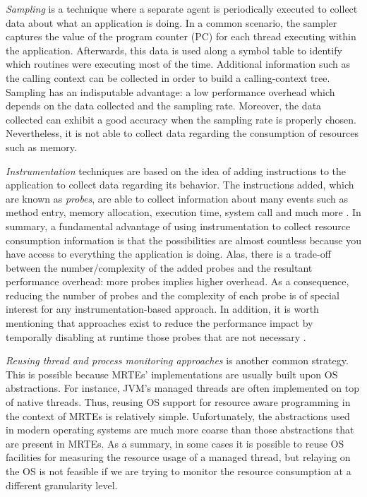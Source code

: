 \textit{Sampling} is a technique where a separate agent is periodically executed to collect data about what an application is doing.
In a common scenario, the sampler captures the value of the program counter (PC) for each thread executing within the application.
Afterwards, this data is used along a symbol table to identify which routines were executing most of the time.
Additional information such as the calling context can be collected in order to build a calling-context tree.
Sampling has an indisputable advantage: a low performance overhead which depends on the data collected and the sampling rate.
Moreover, the data collected can exhibit a good accuracy when the sampling rate is properly chosen.  
Nevertheless, it is not able to collect data regarding the consumption of resources such as memory.

\textit{Instrumentation} techniques are based on the idea of adding instructions to the application to collect data regarding its behavior.
The instructions added, which are known as \textit{probes}, are able to collect information about many events such as method entry, memory allocation, execution time, system call and much more \cite{}.
In summary, a fundamental advantage of using instrumentation to collect resource consumption information is that the possibilities are almost countless because you have access to everything the application is doing.
Alas, there is a trade-off between the number/complexity of the added probes and the resultant performance overhead: more probes implies higher overhead.
As a consequence, reducing the number of probes and the complexity of each probe is of special interest for any instrumentation-based approach.
In addition, it is worth mentioning that approaches exist to reduce the performance impact by temporally disabling at runtime those probes that are not necessary \cite{}.   

\textit{Reusing thread and process monitoring approaches} is another common strategy.
This is possible because MRTEs' implementations are usually built upon OS abstractions.
For instance, JVM's managed threads are often implemented on top of native threads.
Thus, reusing OS support for resource aware programming in the context of MRTEs is relatively simple. 
Unfortunately, the abstractions used in modern operating systems are much more coarse than those abstractions that are present in MRTEs.
As a summary, in some cases it is possible to reuse OS facilities for measuring the resource usage of a managed thread, but relaying on the OS is not feasible if we are trying to monitor the resource consumption at a different granularity level.

